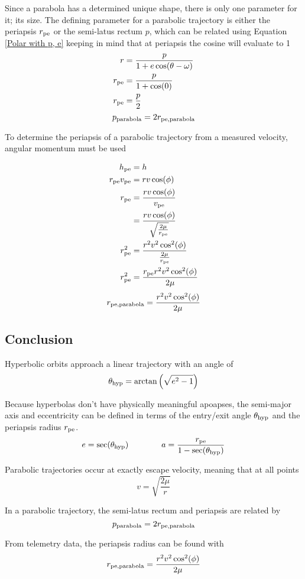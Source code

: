 \documentclass[../basicOrbitalDynamics.tex]{subfiles}
\begin{document}
Since a parabola has a determined unique shape, there is only one parameter for it; its size. The defining parameter for a parabolic trajectory is either the periapsis ${r}_\text{pe}$ or the semi-latus rectum $p$, which can be related using Equation \eqref{Polar with p, e} keeping in mind that at periapsis the cosine will evaluate to 1
\begin{align*}
    r           & =\frac{p}{1+e\cos(\theta-\omega)} \\
    {r}_\text{pe} & =\frac{p}{1+\cos(0)}              \\
    {r}_\text{pe} & =\frac{p}{2}                      \\
\end{align*}
\begin{equation}
    {p}_\text{parabola}=2{r}_\text{pe,parabola}
\end{equation}

To determine the periapsis of a parabolic trajectory from a measured velocity, angular momentum must be used

\begin{align*}
    {h}_\text{pe}            & = h                                                   \\
    {r}_\text{pe}{v}_\text{pe} & =rv\cos(\phi)                                         \\
    {r}_\text{pe}            & =\frac{rv\cos(\phi)}{{v}_\text{pe}}                     \\
                           & =\frac{rv\cos(\phi)}{\sqrt{\frac{2\mu}{{r}_\text{pe}}}} \\
    {r}_\text{pe}^2          & =\frac{r^2v^2\cos^2(\phi)}{\frac{2\mu}{{r}_\text{pe}}}  \\
    {r}_\text{pe}^2          & =\frac{{r}_\text{pe}r^2v^2\cos^2(\phi)}{2\mu}           \\
\end{align*}
\begin{equation}\label{Periapsis Radius Parabola}
    {r}_\text{pe,parabola}=\frac{r^2v^2\cos^2(\phi)}{2\mu}
\end{equation}

\bigskip\bigskip
\subsection{Conclusion}

\bigskip
Hyperbolic orbits approach a linear trajectory with an angle of
\[{\theta}_\text{hyp}=\arctan\left(\sqrt{e^2-1}\right)\]

\bigskip
Because hyperbolas don't have physically meaningful apoapses, the semi-major axis and eccentricity can be defined in terms of the entry/exit angle ${\theta}_\text{hyp}$ and the periapsis radius ${r}_\text{pe}$.
\[e=\sec({\theta}_\text{hyp})\qquad\qquad a=\frac{{{r}_\text{pe}}}{1-\sec({\theta}_\text{hyp})}\]

\bigskip
Parabolic trajectories occur at exactly escape velocity, meaning that at all points
\[v=\sqrt{\frac{2\mu}{r}}\]

\bigskip
In a parabolic trajectory, the semi-latus rectum and periapsis are related by
\[{p}_\text{parabola}=2{r}_\text{pe,parabola}\]

\bigskip
From telemetry data, the periapsis radius can be found with
\[{r}_\text{pe,parabola}=\frac{r^2v^2\cos^2(\phi)}{2\mu}\]
\end{document}
